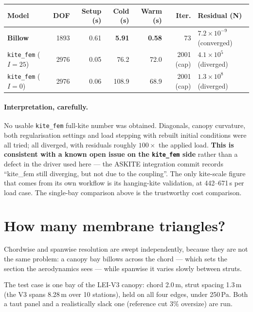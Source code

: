 \documentclass[11pt,a4paper]{article}
\newcommand{\code}[1]{\texttt{\small #1}}
\begin{document}
\begin{table}[H]
\centering
\small
\begin{tabular}{lrrrrrl}
\toprule
Model & DOF & Setup (s) & Cold (s) & Warm (s) & Iter. & Residual (N)\\
\midrule
\textbf{Billow} & 1893 & 0.61 & \textbf{5.91} & \textbf{0.58} & 73
 & $7.2\times10^{-9}$ (converged)\\
\code{kite\_fem} ($I{=}25$) & 2976 & 0.05 & 76.2 & 72.0 & 2001 (cap)
 & $4.1\times10^{5}$ (diverged)\\
\code{kite\_fem} ($I{=}0$) & 2976 & 0.06 & 108.9 & 68.9 & 2001 (cap)
 & $1.3\times10^{8}$ (diverged)\\
\bottomrule
\end{tabular}
\end{table}

\paragraph{Interpretation, carefully.} No usable \code{kite\_fem} full-kite
number was obtained. Diagonals, canopy curvature, both regularisation settings
and load stepping with rebuilt initial conditions were all tried; all diverged,
with residuals roughly $100\times$ the applied load. \textbf{This is consistent
with a known open issue on the \code{kite\_fem} side} rather than a defect in the
driver used here --- the ASKITE integration commit records ``kite\_fem still
diverging, but not due to the coupling''. The only kite-scale figure that comes
from its own workflow is its hanging-kite validation, at 442--671\,s per load
case. The single-bay comparison above is the trustworthy cost comparison.

\section{How many membrane triangles?}

Chordwise and spanwise resolution are swept independently, because they are not
the same problem: a canopy bay billows across the chord --- which sets the
section the aerodynamics sees --- while spanwise it varies slowly between struts.

The test case is one bay of the LEI-V3 canopy: chord 2.0\,m, strut spacing
1.3\,m (the V3 spans 8.28\,m over 10 stations), held on all four edges, under
250\,Pa. Both a taut panel and a realistically slack one (reference cut 3\%
oversize) are run.
\end{document}
